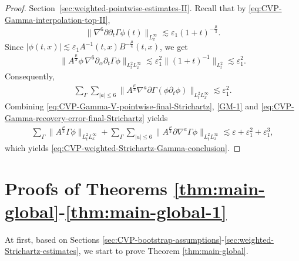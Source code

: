 \documentclass[11pt,twoside]{article}
\def\p{\partial}
\def\ve{\varepsilon}
\def\ls{\lesssim}
\theoremstyle{plain}
\theoremstyle{definition}
\theoremstyle{assumption}
\numberwithin{equation}{section}
\begin{document}
\begin{proof}
		Section~\ref{sec:weighted-pointwise-estimates-II}. Recall that by \eqref{eq:CVP-Gamma-interpolation-top-II},
		\begin{equation}
			\label{eq:CVP-Gamma-interpolation-top-Strichartz}
			\|\nabla^{6}\p\p_t\Gamma\phi(t)\|_{L^\infty_x}
			\ls
			\ve_1(1+t)^{-\frac{\mu}{3}}.
		\end{equation}
		Since
		$|\phi(t,x)|
		\ls
		\ve_1 A^{-1}(t,x)B^{-\frac{\mu}{4}}(t,x)$,
		we get
		\begin{equation}
			\label{eq:CVP-Gamma-recovery-top-error-Strichartz}
			\begin{aligned}
				\|A^{\frac{\mu}{3}}
				\phi\,\nabla^{6}\p_\alpha\p_t\Gamma\phi\|_{L^2_tL^\infty_x}
				\ls
				\ve_1^2
				\|
				(1+t)^{-1}\|_{L^2_t}
				\ls
				\ve_1^2 .
			\end{aligned}
		\end{equation}
		Consequently,
		\begin{equation}
			\label{eq:CVP-Gamma-recovery-error-final-Strichartz}
			\begin{aligned}
				\sum_{\Gamma}
				\sum_{|a|\le 6}
				\big\|
				A^{\frac{\mu}{3}}
				\nabla^a\p\Gamma(\phi\p_t\phi)
				\big\|_{L^2_tL^\infty_x}
				\ls
				\ve_1^2.
			\end{aligned}
		\end{equation}
		Combining
		\eqref{eq:CVP-Gamma-V-pointwise-final-Strichartz}, \eqref{GM-1} and
		\eqref{eq:CVP-Gamma-recovery-error-final-Strichartz} yields
		\begin{equation}
			\label{eq:CVP-Gamma-final-before-absorb-Strichartz}
			\begin{aligned}
				\sum_{\Gamma}
				\big\|
				A^{\frac{\mu}{3}}\Gamma\phi
				\big\|_{L^2_tL^\infty_x}
				+\sum_{\Gamma}
				\sum_{|a|\le 6}
				\big\|
				A^{\frac{\mu}{3}}
				\p\nabla^a\Gamma\phi
				\big\|_{L^2_tL^\infty_x}
				\ls
				\ve+\ve_1^2+\ve_1^3,
			\end{aligned}
		\end{equation}
		which yields
		\eqref{eq:CVP-weighted-Strichartz-Gamma-conclusion}.
	\end{proof}
	
	
	
	
	
	\section{Proofs of Theorems \ref{thm:main-global}-\ref{thm:main-global-1}}\label{sec:Proof-Theorem}
	
	At first, based on Sections \ref{sec:CVP-bootstrap-assumptions}-\ref{sec:weighted-Strichartz-estimates}, we start to prove Theorem \ref{thm:main-global}.
\end{document}
